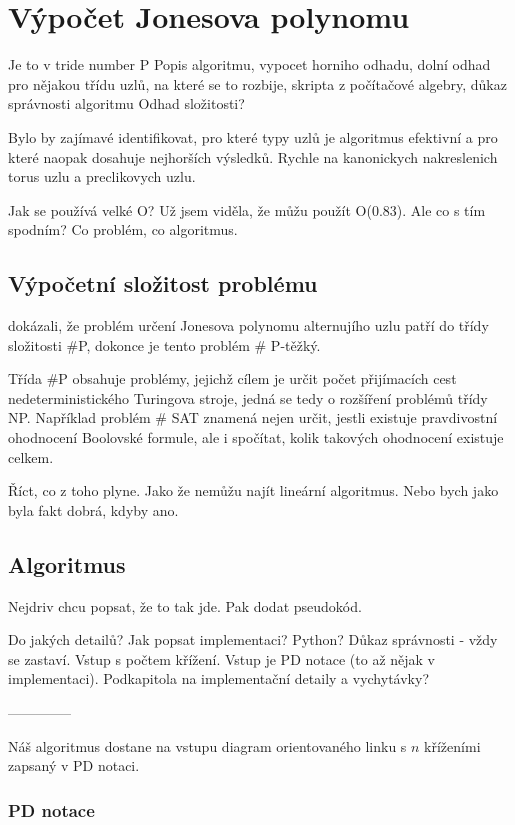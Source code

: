 \chapter{Výpočet Jonesova polynomu}


Je to v tride number P  
Popis algoritmu, vypocet horniho odhadu, dolní odhad pro nějakou třídu uzlů, na které se to rozbije, skripta z počítačové algebry, důkaz správnosti algoritmu
Odhad složitosti?


Bylo by zajímavé identifikovat, pro které typy uzlů je algoritmus efektivní a pro které naopak dosahuje nejhorších výsledků.
Rychle na kanonickych nakreslenich torus uzlu a preclikovych uzlu.

Jak se používá velké O?
Už jsem viděla, že můžu použít O(0.83). Ale co s tím spodním?
Co problém, co algoritmus.

\section{Výpočetní složitost problému}

\citet*{jaeger_vertigan_welsh_1990} dokázali, že problém určení Jonesova polynomu alternujího uzlu patří do třídy složitosti \#P, dokonce je tento problém \# P-těžký. 

Třída \#P obsahuje problémy, jejichž cílem je určit počet přijímacích cest nedeterministického Turingova stroje, jedná se tedy o rozšíření problémů třídy NP. Například problém \# SAT znamená nejen určit, jestli existuje pravdivostní ohodnocení Boolovské formule, ale i spočítat, kolik takových ohodnocení existuje celkem.

Říct, co z toho plyne. Jako že nemůžu najít lineární algoritmus. Nebo bych jako byla fakt dobrá, kdyby ano.

\section{Algoritmus}
Nejdriv chcu popsat, že to tak jde. Pak dodat pseudokód.

Do jakých detailů? Jak popsat implementaci? Python? Důkaz správnosti - vždy se zastaví. Vstup s počtem křížení. Vstup je PD notace (to až nějak v implementaci).
Podkapitola na implementační detaily a vychytávky?

--------------

Náš algoritmus dostane na vstupu diagram orientovaného linku s $n$ kříženími zapsaný v PD notaci.

\subsection{PD notace} 

